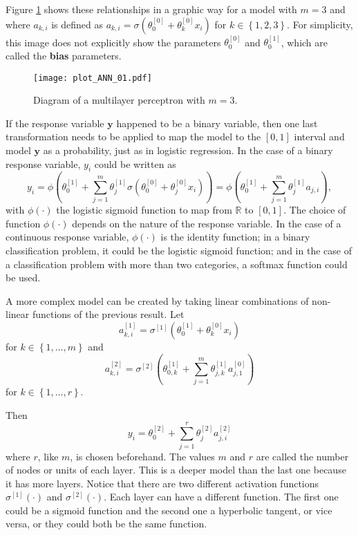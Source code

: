 Figure \ref{fig:theory_ANN_diagram_01} shows these relationships in a graphic way for a model with $m = 3$ and where $a_{k, i}$ is defined as $a_{k, i} = \sigma \left( \theta_0^{[0]} + \theta_k^{[0]} x_i \right)$ for $k \in \left\{ 1, 2, 3 \right\}$.
For simplicity, this image does not explicitly show the parameters $\theta_0^{[0]}$ and $\theta_0^{[1]}$, which are called the \textbf{bias} parameters.

\begin{figure}[H]
    \centering
    \texttt{[image: plot\_ANN\_01.pdf]}
    \caption{Diagram of a multilayer perceptron with $m = 3$.}
    \label{fig:theory_ANN_diagram_01}
\end{figure}

If the response variable $\boldsymbol{y}$ happened to be a binary variable, then one last transformation needs to be applied to map the model to the $\left[0, 1\right]$ interval and model $\boldsymbol{y}$ as a probability, just as in logistic regression. In the case of a binary response variable, $y_i$ could be written as
\begin{equation}
  y_i =
  \phi \left( \theta_0^{[1]} +  \sum_{j = 1}^m \theta_j^{[1]} \sigma \left( \theta_0^{[0]} + \theta_j^{[0]} x_i \right) \right) =
  \phi \left( \theta_0^{[1]} +  \sum_{j = 1}^m \theta_j^{[1]} a_{j,i} \right),
\end{equation}
with $\phi(\cdot)$ the logistic sigmoid function to map from $\mathbb{R}$ to $\left[ 0, 1 \right]$. The choice of function $\phi(\cdot)$ depends on the nature of the response variable. In the case of a continuous response variable, $\phi(\cdot)$ is the identity function; in a binary classification problem, it could be the logistic sigmoid function; and in the case of a classification problem with more than two categories, a softmax function could be used.

A more complex model can be created by taking linear combinations of non-linear functions of the previous result. Let
\begin{equation}
a_{k,i}^{[1]} = \sigma^{[1]} \left( \theta_{0}^{[1]} + \theta_k^{[0]} x_i \right)
\end{equation}
for $k \in \left\{ 1, \ldots, m \right\}$ and
\begin{equation}
  a_{k,i}^{[2]} = \sigma^{[2]} \left(  \theta_{0,k}^{[1]} + \sum_{j = 1}^m \theta_{j,k}^{[1]} a_{j,1}^{[0]}  \right)
\end{equation}for $k \in \left\{ 1, \ldots, r \right\}$.

Then
\begin{equation}
  y_i = \theta_0^{[2]} + \sum_{j = 1}^r \theta_j^{[2]} a_{j,i}^{[2]}
\end{equation}
where $r$, like $m$, is chosen beforehand. The values $m$ and $r$ are called the number of nodes or units of each layer. This is a deeper model than the last one because it has more layers. Notice that there are two different activation functions $\sigma^{[1]}(\cdot)$ and $\sigma^{[2]}(\cdot)$. Each layer can have a different function. The first one could be a sigmoid function and the second one a hyperbolic tangent, or vice versa, or they could both be the same function.

